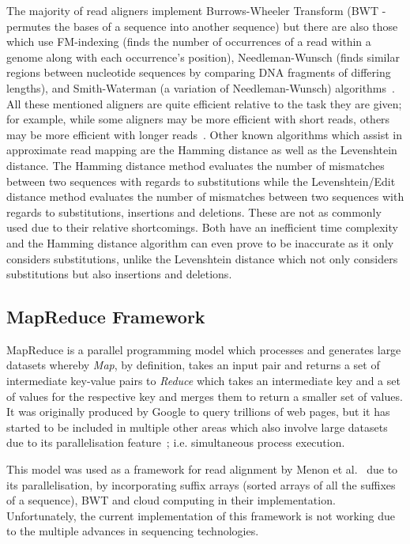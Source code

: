 \documentclass{csfyp}
\begin{document}
The majority of read aligners implement Burrows-Wheeler Transform (BWT - permutes the bases of a sequence into another sequence) but there are also those which use FM-indexing (finds the number of occurrences of a read within a genome along with each occurrence's position), Needleman-Wunsch (finds similar regions between nucleotide sequences by comparing DNA fragments of differing lengths), and Smith-Waterman (a variation of Needleman-Wunsch) algorithms~\cite{bwtransform, popgen, cgreads}.  All these mentioned aligners are quite efficient relative to the task they are given; for example, while some aligners may be more efficient with short reads, others may be more efficient with longer reads~\cite{companalys, compalign}.  Other known algorithms which assist in approximate read mapping are the Hamming distance as well as the Levenshtein distance.  The Hamming distance method evaluates the number of mismatches between two sequences with regards to substitutions while the Levenshtein/Edit distance method evaluates the number of mismatches between two sequences with regards to substitutions, insertions and deletions.  These are not as commonly used due to their relative shortcomings.  Both have an inefficient time complexity and the Hamming distance algorithm can even prove to be inaccurate as it only considers substitutions, unlike the Levenshtein distance which not only considers substitutions but also insertions and deletions.  

\subsection{MapReduce Framework}\vspace{-2ex}
MapReduce is a parallel programming model which processes and generates large datasets whereby {\textit{Map}}, by definition, takes an input pair and returns a set of intermediate key-value pairs to {\textit{Reduce}} which takes an intermediate key and a set of values for the respective key and merges them to return a smaller set of values.  It was originally produced by Google to query trillions of web pages, but it has started to be included in multiple other areas which also involve large datasets due to its parallelisation feature~\cite{mapreduce}; i.e. simultaneous process execution.    

This model was used as a framework for read alignment by Menon et al.~\cite{mapredgen} due to its parallelisation, by incorporating suffix arrays (sorted arrays of all the suffixes of a sequence), BWT and cloud computing in their implementation.  Unfortunately, the current implementation of this framework is not working due to the multiple advances in sequencing technologies.              
\end{document}
